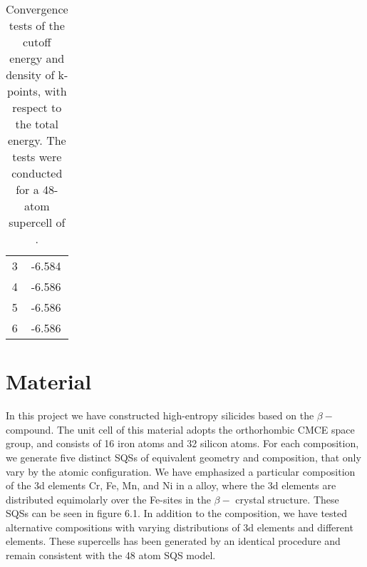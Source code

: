 \begin{table}[H]
\begin{tabular}{@{}cc@{}}
3                                                            & -6.584                                                       \\
4                                                            & -6.586                                                       \\
5                                                            & -6.586                                                       \\
6                                                            & -6.586                                                       \\ \bottomrule
\end{tabular}
\caption{Convergence tests of the cutoff energy and density of k-points, with respect to the total energy. The tests were conducted for a 48-atom supercell of .}
\end{table}


\section{Material}
In this project we have constructed high-entropy silicides based on the $\beta-$  compound. The unit cell of this material adopts the orthorhombic CMCE space group, and consists of 16 iron atoms and 32 silicon atoms. For each composition, we generate five distinct SQSs of equivalent geometry and composition, that only vary by the atomic configuration. We have emphasized a particular composition of the 3d elements Cr, Fe, Mn, and Ni in a  alloy, where the 3d elements are distributed equimolarly over the Fe-sites in the $\beta-$  crystal structure. These SQSs can be seen in figure 6.1. In addition to the  composition, we have tested alternative compositions with varying distributions of 3d elements and different elements. These supercells has been generated by an identical procedure and remain consistent with the 48 atom SQS model.

